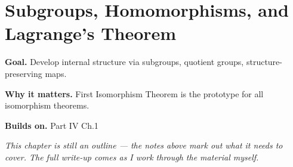 \chapter{Subgroups, Homomorphisms, and Lagrange's Theorem}
\label{ch:04-abstract-algebra-02}

\begin{chapterintro}
\textbf{Goal.} Develop internal structure via subgroups, quotient groups, structure-preserving maps.

\textbf{Why it matters.} First Isomorphism Theorem is the prototype for all isomorphism theorems.

\textbf{Builds on.} Part IV Ch.1
\end{chapterintro}

\textit{This chapter is still an outline --- the notes above mark out what it needs to cover. The full write-up comes as I work through the material myself.}
